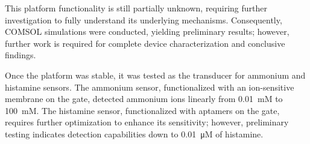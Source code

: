 This platform functionality is still partially unknown, requiring further investigation to fully understand its underlying mechanisms. Consequently, COMSOL simulations were conducted, yielding preliminary results; however, further work is required for complete device characterization and conclusive findings. 

Once the platform was stable, it was tested as the transducer for ammonium and histamine sensors. The ammonium sensor, functionalized with an ion-sensitive membrane on the gate, detected ammonium ions linearly from \SI{0.01}{mM} to \SI{100}{mM}. The histamine sensor, functionalized with aptamers on the gate, requires further optimization to enhance its sensitivity; however, preliminary testing indicates detection capabilities down to \SI{0.01}{\micro M} of histamine.

